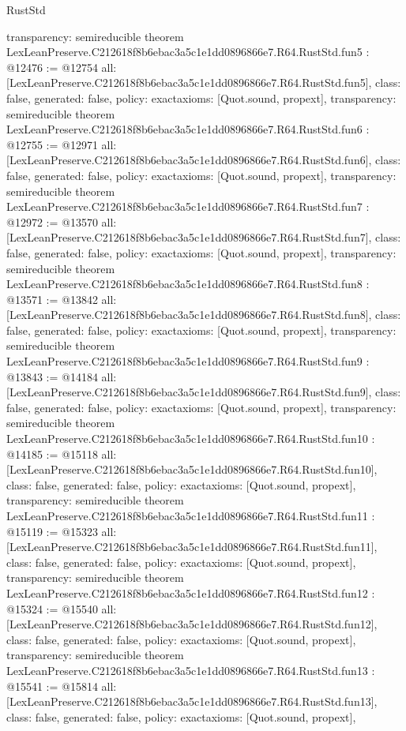 \begin{lexlean}{RustStd}
\begin{coremodule}
{  transparency: semireducible
}
theorem LexLeanPreserve.C212618f8b6ebac3a5c1e1dd0896866e7.R64.RustStd.fun5 : @12476 := @12754 {
  all: [LexLeanPreserve.C212618f8b6ebac3a5c1e1dd0896866e7.R64.RustStd.fun5],
  class: false,
  generated: false,
  policy: exact{axioms: [Quot.sound, propext]},
  transparency: semireducible
}
theorem LexLeanPreserve.C212618f8b6ebac3a5c1e1dd0896866e7.R64.RustStd.fun6 : @12755 := @12971 {
  all: [LexLeanPreserve.C212618f8b6ebac3a5c1e1dd0896866e7.R64.RustStd.fun6],
  class: false,
  generated: false,
  policy: exact{axioms: [Quot.sound, propext]},
  transparency: semireducible
}
theorem LexLeanPreserve.C212618f8b6ebac3a5c1e1dd0896866e7.R64.RustStd.fun7 : @12972 := @13570 {
  all: [LexLeanPreserve.C212618f8b6ebac3a5c1e1dd0896866e7.R64.RustStd.fun7],
  class: false,
  generated: false,
  policy: exact{axioms: [Quot.sound, propext]},
  transparency: semireducible
}
theorem LexLeanPreserve.C212618f8b6ebac3a5c1e1dd0896866e7.R64.RustStd.fun8 : @13571 := @13842 {
  all: [LexLeanPreserve.C212618f8b6ebac3a5c1e1dd0896866e7.R64.RustStd.fun8],
  class: false,
  generated: false,
  policy: exact{axioms: [Quot.sound, propext]},
  transparency: semireducible
}
theorem LexLeanPreserve.C212618f8b6ebac3a5c1e1dd0896866e7.R64.RustStd.fun9 : @13843 := @14184 {
  all: [LexLeanPreserve.C212618f8b6ebac3a5c1e1dd0896866e7.R64.RustStd.fun9],
  class: false,
  generated: false,
  policy: exact{axioms: [Quot.sound, propext]},
  transparency: semireducible
}
theorem LexLeanPreserve.C212618f8b6ebac3a5c1e1dd0896866e7.R64.RustStd.fun10 : @14185 := @15118 {
  all: [LexLeanPreserve.C212618f8b6ebac3a5c1e1dd0896866e7.R64.RustStd.fun10],
  class: false,
  generated: false,
  policy: exact{axioms: [Quot.sound, propext]},
  transparency: semireducible
}
theorem LexLeanPreserve.C212618f8b6ebac3a5c1e1dd0896866e7.R64.RustStd.fun11 : @15119 := @15323 {
  all: [LexLeanPreserve.C212618f8b6ebac3a5c1e1dd0896866e7.R64.RustStd.fun11],
  class: false,
  generated: false,
  policy: exact{axioms: [Quot.sound, propext]},
  transparency: semireducible
}
theorem LexLeanPreserve.C212618f8b6ebac3a5c1e1dd0896866e7.R64.RustStd.fun12 : @15324 := @15540 {
  all: [LexLeanPreserve.C212618f8b6ebac3a5c1e1dd0896866e7.R64.RustStd.fun12],
  class: false,
  generated: false,
  policy: exact{axioms: [Quot.sound, propext]},
  transparency: semireducible
}
theorem LexLeanPreserve.C212618f8b6ebac3a5c1e1dd0896866e7.R64.RustStd.fun13 : @15541 := @15814 {
  all: [LexLeanPreserve.C212618f8b6ebac3a5c1e1dd0896866e7.R64.RustStd.fun13],
  class: false,
  generated: false,
  policy: exact{axioms: [Quot.sound, propext]},
}
\end{coremodule}
\end{lexlean}
